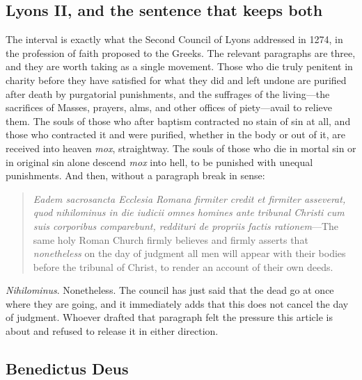 \subsection{Lyons II, and the sentence that keeps both}

The interval is exactly what the Second Council of Lyons addressed in 1274, in the profession of faith proposed to the Greeks. The relevant paragraphs are three, and they are worth taking as a single movement. Those who die truly penitent in charity before they have satisfied for what they did and left undone are purified after death by purgatorial punishments, and the suffrages of the living---the sacrifices of Masses, prayers, alms, and other offices of piety---avail to relieve them. The souls of those who after baptism contracted no stain of sin at all, and those who contracted it and were purified, whether in the body or out of it, are received into heaven \emph{mox}, straightway. The souls of those who die in mortal sin or in original sin alone descend \emph{mox} into hell, to be punished with unequal punishments. And then, without a paragraph break in sense:

\begin{quote}
\emph{Eadem sacrosancta Ecclesia Romana firmiter credit et firmiter asseverat, quod nihilominus in die iudicii omnes homines ante tribunal Christi cum suis corporibus comparebunt, reddituri de propriis factis rationem}---The same holy Roman Church firmly believes and firmly asserts that \emph{nonetheless} on the day of judgment all men will appear with their bodies before the tribunal of Christ, to render an account of their own deeds.
\end{quote}

\emph{Nihilominus}. Nonetheless. The council has just said that the dead go at once where they are going, and it immediately adds that this does not cancel the day of judgment. Whoever drafted that paragraph felt the pressure this article is about and refused to release it in either direction.

\subsection{Benedictus Deus}

